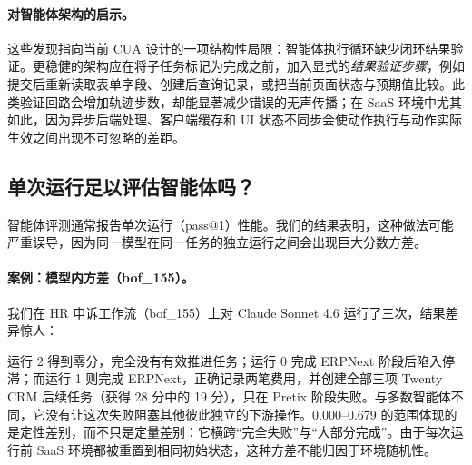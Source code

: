 \paragraph{对智能体架构的启示。} 这些发现指向当前 CUA 设计的一项结构性局限：智能体执行循环缺少闭环结果验证。更稳健的架构应在将子任务标记为完成之前，加入显式的\emph{结果验证步骤}，例如提交后重新读取表单字段、创建后查询记录，或把当前页面状态与预期值比较。此类验证回路会增加轨迹步数，却能显著减少错误的无声传播；在 SaaS 环境中尤其如此，因为异步后端处理、客户端缓存和 UI 状态不同步会使动作执行与动作实际生效之间出现不可忽略的差距。

\subsection{单次运行足以评估智能体吗？}
\label{disc-var}

智能体评测通常报告单次运行（pass@1）性能。我们的结果表明，这种做法可能严重误导，因为同一模型在同一任务的独立运行之间会出现巨大分数方差。

\paragraph{案例：模型内方差（{\ttfamily bof\_155}）。} 我们在 HR 申诉工作流（{\ttfamily bof\_155}）上对 Claude Sonnet 4.6 运行了三次，结果差异惊人：

\begin{table}[H]
\centering
\small
{}
\end{table}

运行 2 得到零分，完全没有有效推进任务；运行 0 完成 ERPNext 阶段后陷入停滞；而运行 1 则完成 ERPNext，正确记录两笔费用，并创建全部三项 Twenty CRM 后续任务（获得 28 分中的 19 分），只在 Pretix 阶段失败。与多数智能体不同，它没有让这次失败阻塞其他彼此独立的下游操作。0.000--0.679 的范围体现的是定性差别，而不只是定量差别：它横跨“完全失败”与“大部分完成”。由于每次运行前 SaaS 环境都被重置到相同初始状态，这种方差不能归因于环境随机性。

